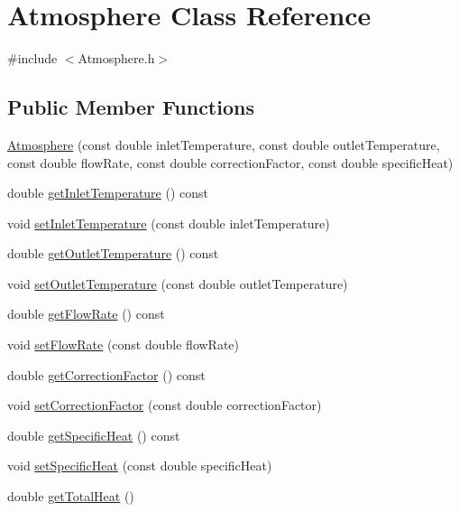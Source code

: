 \hypertarget{class_atmosphere}{}\section{Atmosphere Class Reference}
\label{class_atmosphere}


{\ttfamily \#include $<$Atmosphere.\+h$>$}

\subsection*{Public Member Functions}
\begin{DoxyCompactItemize}
\item 
\hyperlink{class_atmosphere_adbd727cfc7682d3b3b72a4fb101531f1}{Atmosphere} (const double inlet\+Temperature, const double outlet\+Temperature, const double flow\+Rate, const double correction\+Factor, const double specific\+Heat)
\item 
double \hyperlink{class_atmosphere_acb944a3a99cd40f0132713ce73e6ca4a}{get\+Inlet\+Temperature} () const
\item 
void \hyperlink{class_atmosphere_a592bf7f82ea518fbd9da86d8f10cbc5c}{set\+Inlet\+Temperature} (const double inlet\+Temperature)
\item 
double \hyperlink{class_atmosphere_a717e2dc78ebd13420f8f26707374dd3f}{get\+Outlet\+Temperature} () const
\item 
void \hyperlink{class_atmosphere_a8f6589ab4e17d3c531bb7e0e771f4f80}{set\+Outlet\+Temperature} (const double outlet\+Temperature)
\item 
double \hyperlink{class_atmosphere_ad34708b12c8c9af4fce47669d68ebf4d}{get\+Flow\+Rate} () const
\item 
void \hyperlink{class_atmosphere_a9ff0b718c810aec0bb101336db69fd22}{set\+Flow\+Rate} (const double flow\+Rate)
\item 
double \hyperlink{class_atmosphere_a79c94343c7b6659b2f79688a1ba69aed}{get\+Correction\+Factor} () const
\item 
void \hyperlink{class_atmosphere_a86fab4b05de35c9a2b1a3a7e5ab70779}{set\+Correction\+Factor} (const double correction\+Factor)
\item 
double \hyperlink{class_atmosphere_a59802a10861a58ab0f0f4e0ab8671e14}{get\+Specific\+Heat} () const
\item 
void \hyperlink{class_atmosphere_a17450de3bc7a64b2736b1fe8785410cd}{set\+Specific\+Heat} (const double specific\+Heat)
\item 
double \hyperlink{class_atmosphere_ad3dd28020262aee76d374cbfb7998e46}{get\+Total\+Heat} ()

\end{DoxyCompactItemize}
